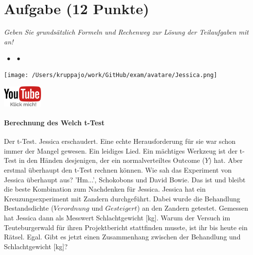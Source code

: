 \documentclass[a4paper, 9pt]{scrartcl}\usepackage[]{graphicx}\usepackage[]{xcolor}
\begin{document}
\section{Aufgabe \hfill (12 Punkte)}

\textit{Geben Sie grundsätzlich Formeln und Rechenweg zur Lösung der Teilaufgaben mit an!} \\[1Ex]
 

 
\ifcollection
\begin{flushright}
\tiny\vspace{-3Ex}
\textbf{\examinhaltstart}
\exammodulemathstat $\;\bullet$
\exammodulestat $\;\bullet$
\exammodulestatbbv 
\vspace{-4Ex}
\end{flushright}
\begin{minipage}[t]{0.5\textwidth}
\texttt{[image: /Users/kruppajo/work/GitHub/exam/avatare/Jessica.png]}
\end{minipage}
\begin{minipage}[t]{0.5\textwidth}
\hfill
\href{https://youtu.be/TbSEOMCQYl4}{\includegraphics[width = 2cm]{img/youtube}}
\end{minipage}
\vspace{-3ex}
\fi



\ifcollection
\paragraph{Berechnung des Welch t-Test}
\fi


Der t-Test. Jessica erschaudert. Eine echte Herausforderung für sie war schon immer der Mangel gewesen. Ein leidiges Lied. Ein mächtiges Werkzeug ist der t-Test in den Händen desjenigen, der ein normalverteiltes Outcome ($Y$) hat. Aber erstmal überhaupt den t-Test rechnen können. Wie sah das Experiment von Jessica überhaupt aus? 'Hm...', Schokobons und David Bowie. Das ist und bleibt die beste Kombination zum Nachdenken für Jessica. Jessica hat ein Kreuzungsexperiment mit Zandern durchgeführt. Dabei wurde die Behandlung Bestandsdichte ($Verordnung$ und $Gesteigert$) an den Zandern getestet. Gemessen hat Jessica dann als Messwert Schlachtgewicht [kg]. Warum der Versuch im Teuteburgerwald für ihren Projektbericht stattfinden musste, ist ihr bis heute ein Rätsel. Egal. Gibt es jetzt einen Zusammenhang zwischen der Behandlung und Schlachtgewicht [kg]?
\end{document}
